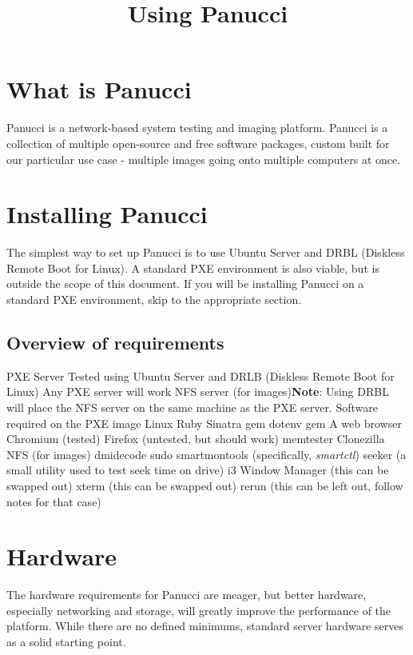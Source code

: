\documentclass{article}
\begin{document}
\title{Using Panucci}
\maketitle
\section{What is Panucci}


Panucci is a network-based system testing and imaging platform.\linebreak\linebreak
Panucci is a collection of multiple open-source and free software packages, custom built for our particular use case - multiple images going onto multiple computers at once.\pagebreak

\section{Installing Panucci}
The simplest way to set up Panucci is to use Ubuntu Server and DRBL (Diskless Remote Boot for Linux).  A standard PXE environment is also viable, but is outside the scope of this document.  If you will be installing Panucci on a standard PXE environment, skip to the appropriate section.
\subsection{Overview of requirements}
\begin{outline}
  \1 PXE Server
    \2 Tested using Ubuntu Server and DRLB (Diskless Remote Boot for Linux)
    \2 Any PXE server will work
  \1 NFS server (for images)\textbf{Note}: Using DRBL will place the NFS server on the same machine as the PXE server.
  \1 Software required on the PXE image
    \2 Linux
    \2 Ruby
      \3 Sinatra gem
      \3 dotenv gem
    \2 A web browser
      \3 Chromium (tested)
      \3 Firefox (untested, but should work)
    \2 memtester
    \2 Clonezilla
    \2 NFS (for images)
    \2 dmidecode
    \2 sudo
    \2 smartmontools (specifically, \textit{smartctl})
    \2 seeker (a small utility used to test seek time on drive)
    \2 i3 Window Manager (this can be swapped out)
    \2 xterm (this can be swapped out)
    \2 rerun (this can be left out, follow notes for that case)
\end{outline}\pagebreak

\section{Hardware}
The hardware requirements for Panucci are meager, but better hardware, especially networking and storage, will greatly improve the performance of the platform.  While there are no defined minimums, standard server hardware serves as a solid starting point.
\end{document}
